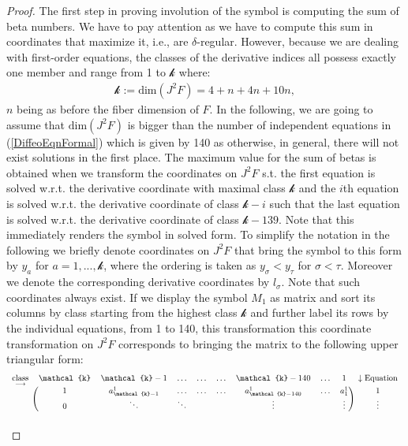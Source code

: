 \begin{proof}
The first step in proving involution of the symbol is computing the sum of beta numbers. We have to pay attention as we have to compute this sum in coordinates that maximize it, i.e., are $\delta$-regular. However, because we are dealing with first-order equations, the classes of the derivative indices all possess exactly one member and range from 1 to $\mathcal{k}$ where: 
\begin{align}
    \mathcal{k} := \mathrm{dim}(J^2F) = 4+n+4n+10n,
\end{align}
$n$ being as before the fiber dimension of $F$. 
In the following, we are going to assume that $\mathrm{dim}(J^2F)$ is bigger than the number of independent equations in (\ref{DiffeoEqnFormal}) which is given by 140 as otherwise, in general, there will not exist solutions in the first place. 
The maximum value for the sum of betas is obtained when we transform the coordinates on $J^2F$ s.t. the first equation is solved w.r.t. the derivative coordinate with maximal class $\mathcal{k}$ and the $i$th equation is solved w.r.t. the derivative coordinate of class $\mathcal{k}-i$ such that the last equation is solved w.r.t. the derivative coordinate of class $\mathcal{k}-139$.
Note that this immediately renders the symbol in solved form.
To simplify the notation in the following we briefly denote coordinates on $J^2F$ that bring the symbol to this form by $y_a$ for $a = 1,...,\mathcal{k}$, where the ordering is taken as $y_{\sigma} < y_{\tau}$ for $\sigma < \tau$. Moreover we denote the corresponding derivative coordinates by $l_{\sigma}$. 
Note that such coordinates always exist. 
If we display the symbol $M_1$ as matrix and sort its columns by class starting from the highest class $\mathcal{k}$ and further label its rows by the individual equations, from 1 to 140, this transformation this coordinate transformation on $J^2F$ corresponds to bringing the matrix to the following upper triangular form:
\begin{align}\label{symbolMat}
\begin{blockarray}{cccccccccc}
\underset{\longrightarrow}{\text{class}} & \mathcal{k} & \mathcal{k} -1 & \hdots & \hdots & \hdots & \mathcal{k}- 140 & \hdots & 1 & \downarrow \text{Equation} \\
\begin{block}{c(cccccccc)c}
   & 1 & a^1_{\mathcal{k}-1} & \hdots & \hdots & \hdots & a^1_{\mathcal{k} -140} & \hdots & a^1_1 & 1 \\
    & 0 & \ddots & \ddots & &  & \vdots & & \vdots & \vdots \\

\end{block}
\end{blockarray}
\end{align}
\end{proof}
